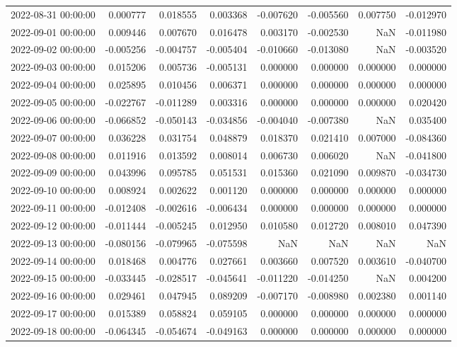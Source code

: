 \begin{tabular}{lrrrrrrr}
2022-08-31 00:00:00 & 0.000777 & 0.018555 & 0.003368 & -0.007620 & -0.005560 & 0.007750 & -0.012970 \\
2022-09-01 00:00:00 & 0.009446 & 0.007670 & 0.016478 & 0.003170 & -0.002530 & NaN & -0.011980 \\
2022-09-02 00:00:00 & -0.005256 & -0.004757 & -0.005404 & -0.010660 & -0.013080 & NaN & -0.003520 \\
2022-09-03 00:00:00 & 0.015206 & 0.005736 & -0.005131 & 0.000000 & 0.000000 & 0.000000 & 0.000000 \\
2022-09-04 00:00:00 & 0.025895 & 0.010456 & 0.006371 & 0.000000 & 0.000000 & 0.000000 & 0.000000 \\
2022-09-05 00:00:00 & -0.022767 & -0.011289 & 0.003316 & 0.000000 & 0.000000 & 0.000000 & 0.020420 \\
2022-09-06 00:00:00 & -0.066852 & -0.050143 & -0.034856 & -0.004040 & -0.007380 & NaN & 0.035400 \\
2022-09-07 00:00:00 & 0.036228 & 0.031754 & 0.048879 & 0.018370 & 0.021410 & 0.007000 & -0.084360 \\
2022-09-08 00:00:00 & 0.011916 & 0.013592 & 0.008014 & 0.006730 & 0.006020 & NaN & -0.041800 \\
2022-09-09 00:00:00 & 0.043996 & 0.095785 & 0.051531 & 0.015360 & 0.021090 & 0.009870 & -0.034730 \\
2022-09-10 00:00:00 & 0.008924 & 0.002622 & 0.001120 & 0.000000 & 0.000000 & 0.000000 & 0.000000 \\
2022-09-11 00:00:00 & -0.012408 & -0.002616 & -0.006434 & 0.000000 & 0.000000 & 0.000000 & 0.000000 \\
2022-09-12 00:00:00 & -0.011444 & -0.005245 & 0.012950 & 0.010580 & 0.012720 & 0.008010 & 0.047390 \\
2022-09-13 00:00:00 & -0.080156 & -0.079965 & -0.075598 & NaN & NaN & NaN & NaN \\
2022-09-14 00:00:00 & 0.018468 & 0.004776 & 0.027661 & 0.003660 & 0.007520 & 0.003610 & -0.040700 \\
2022-09-15 00:00:00 & -0.033445 & -0.028517 & -0.045641 & -0.011220 & -0.014250 & NaN & 0.004200 \\
2022-09-16 00:00:00 & 0.029461 & 0.047945 & 0.089209 & -0.007170 & -0.008980 & 0.002380 & 0.001140 \\
2022-09-17 00:00:00 & 0.015389 & 0.058824 & 0.059105 & 0.000000 & 0.000000 & 0.000000 & 0.000000 \\
2022-09-18 00:00:00 & -0.064345 & -0.054674 & -0.049163 & 0.000000 & 0.000000 & 0.000000 & 0.000000 \\

\end{tabular}
